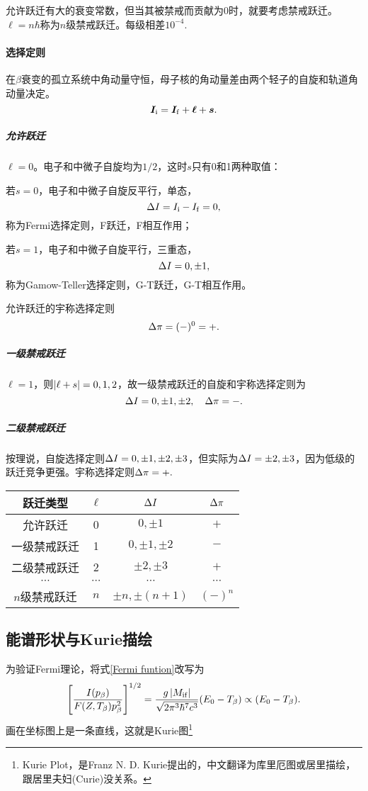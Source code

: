 允许跃迁有大的衰变常数，但当其被禁戒而贡献为0时，就要考虑禁戒跃迁。$\ell=n\hbar$称为$n$级禁戒跃迁。每级相差$10^{-4}.$
\paragraph{选择定则}在$\beta$衰变的孤立系统中角动量守恒，母子核的角动量差由两个轻子的自旋和轨道角动量决定。
\[
	\bm I_{\mathrm{i}}=\bm I_{\mathrm{f}}+\bm\ell+\bm s.
\]

\subparagraph{允许跃迁}
$\ell=0$。电子和中微子自旋均为$1/2$，这时$s$只有0和1两种取值：
\begin{compactenum}
	\item 若$s=0$，电子和中微子自旋反平行，单态，
	\[
		\Delta I=I_{\mathrm{i}}-I_{\mathrm{f}}=0,
	\]
	称为Fermi选择定则，F跃迁，F相互作用；
	\item 若$s=1$，电子和中微子自旋平行，三重态，
	\[
		\Delta I=0,\pm 1,
	\]
	称为Gamow-Teller选择定则，G-T跃迁，G-T相互作用。
\end{compactenum}
允许跃迁的宇称选择定则
\[
	\Delta\pi=(-)^0=+.
\]
\subparagraph{一级禁戒跃迁}
$\ell=1$，则$\left\lvert\ell+s\right\rvert=0,1,2$，故一级禁戒跃迁的自旋和宇称选择定则为
\[
	\Delta I=0,\pm 1,\pm 2,\quad\Delta\pi=-.
\]
\subparagraph{二级禁戒跃迁}
按理说，自旋选择定则$\Delta I=0,\pm 1,\pm 2,\pm 3$，但实际为$\Delta I=\pm 2,\pm 3$，因为低级的跃迁竞争更强。宇称选择定则$\Delta\pi=+.$
\begin{center}
	\begin{tabular}{cccc}
		\toprule
		跃迁类型&$\ell$&$\Delta I$&$\Delta\pi$\\
		\midrule
		允许跃迁&0&$0,\pm 1$&$+$\\
		一级禁戒跃迁&1&$0,\pm 1,\pm 2$&$-$\\
		二级禁戒跃迁&2&$\pm 2,\pm 3$&$+$\\
		$\cdots$&$\cdots$&$\cdots$&$\cdots$\\
		$n$级禁戒跃迁&$n$&$\pm n,\pm(n+1)$&$(-)^n$\\
		\bottomrule
	\end{tabular}
\end{center}

\subsection{\textbeta 能谱形状与Kurie描绘}

为验证Fermi理论，将式\eqref{Fermi funtion}改写为
\[
	\left[\frac{I(p_\beta)}{F(Z,T_\beta)p_\beta^2}\right]^{1/2}=\frac{g\left\lvert M_{\mathrm{i}\mathrm{f}}\right\rvert}{\sqrt{2\pi^3\hbar^7c^3}}(E_0-T_\beta)\propto(E_0-T_\beta).
\]
画在坐标图上是一条直线，这就是Kurie图\footnote{Kurie Plot，是Franz N. D. Kurie提出的，中文翻译为库里厄图或居里描绘，跟居里夫妇(Curie)没关系。}

